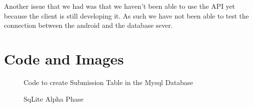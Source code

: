 \documentclass[onecolumn, draftclsnofoot,10pt, compsoc]{IEEEtran}
\begin{document}
Another issue that we had was that we haven't been able to use the API yet because the client is still developing it. As such we have not been able to test the connection between the android and the database sever.



\section{Code and Images}

\begin{figure} [htp]
 \caption{Code to create Submission Table in the Mysql Database}
\end{figure}

\begin{figure}
\caption{SqLite Alpha Phase}
\end{figure}
\end{document}
